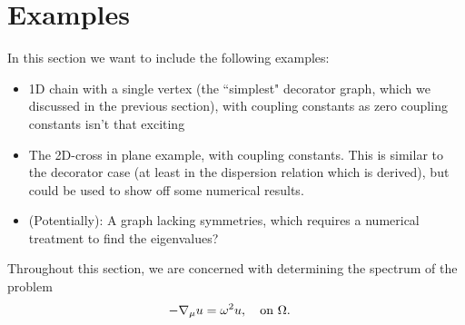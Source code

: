 \section{Examples} \label{sec:Examples}
In this section we want to include the following examples:
\begin{itemize}
	\item 1D chain with a single vertex (the ``simplest" decorator graph, which we discussed in the previous section), with coupling constants as zero coupling constants isn't that exciting
	\item The 2D-cross in plane example, with coupling constants. This is similar to the decorator case (at least in the dispersion relation which is derived), but could be used to show off some numerical results.
	\item (Potentially): A graph lacking symmetries, which requires a numerical treatment to find the eigenvalues?
\end{itemize}

Throughout this section, we are concerned with determining the spectrum of the problem 
\begin{align*}
	-\nabla_{\mu} u &= \omega^2 u, \quad\text{on } \Omega.
\end{align*}

